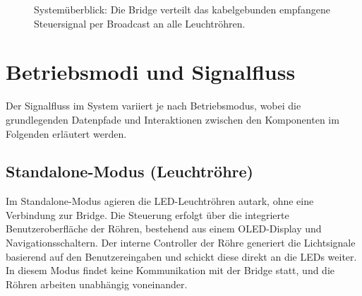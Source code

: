 \begin{figure}[H]
    \centering
    \caption{Systemüberblick: Die Bridge verteilt das kabelgebunden empfangene Steuersignal per Broadcast an alle Leuchtröhren.}
    \label{fig:systemueberblick}
\end{figure}

\section{Betriebsmodi und Signalfluss}
\label{sec:betriebsmodi-signalfluss}

Der Signalfluss im System variiert je nach Betriebsmodus, wobei die grundlegenden Datenpfade und 
Interaktionen zwischen den Komponenten im Folgenden erläutert werden.

 \subsection{Standalone-Modus (Leuchtröhre)}
\label{subsec:signalfluss-einzelbetrieb}

Im Standalone-Modus agieren die LED-Leuchtröhren autark, ohne eine Verbindung zur Bridge.
Die Steuerung erfolgt über die integrierte Benutzeroberfläche der Röhren, bestehend aus 
einem OLED-Display und Navigationsschaltern.
Der interne Controller der Röhre generiert die Lichtsignale basierend auf den Benutzereingaben 
und schickt diese direkt an die LEDs weiter.
In diesem Modus findet keine Kommunikation mit der Bridge statt, und die Röhren arbeiten unabhängig voneinander.


